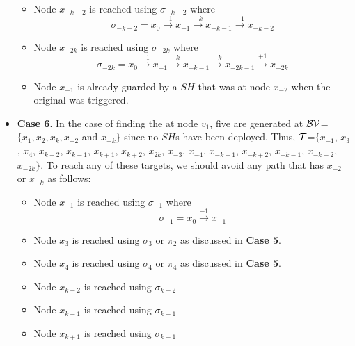\begin{itemize}
\begin{itemize}
\item Node $x_{-k-2}$ is reached using $\sigma_{-k-2}$  where 
$$\sigma_{-k-2} = x_{0} \xrightarrow {-1} x_{-1} \xrightarrow {-k} x_{-k-1} \xrightarrow {-1} x_{-k-2} $$





\item Node $x_{-2k}$ is reached using $\sigma_{-2k}$  where 
$$\sigma_{-2k} = x_{0} \xrightarrow {-1} x_{-1} \xrightarrow {-k} x_{-k-1} \xrightarrow {-k} x_{-2k-1} \xrightarrow {+1} x_{-2k}$$



\item Node $x_{-1}$ is already guarded by a $SH$ that was at node $x_{-2}$ when the original \bv was triggered.


\end{itemize}





\item {\bf Case 6}.  In the case of finding the \bv at node $v_1$, five \bvs are generated at $\cal BV$=$\{x_1,x_2,x_k,x_{-2}$ and $x_{-k}\}$ since no $SH$s have been deployed. Thus,
$\cal T$=$\{x_{-1}$, $ x_{3}$,  $x_{4}$, $x_{k-2}$, $x_{k-1}$, $x_{k+1}$, $x_{k+2}$, $x_{2k}$, $x_{-3}$, $x_{-4}$, $x_{-k+1}$, $x_{-k+2}$, $x_{-k-1}$, $x_{-k-2}$, $x_{-2k} \}$. To reach any of these targets, we should avoid any path that has $x_{-2}$ or $x_{-k}$ as follows:
\begin{itemize} 
\item Node $x_{-1}$ is reached using $\sigma_{-1}$ where 
$$\sigma_{-1} = x_{0} \xrightarrow {-1} x_{-1} $$


\item Node $x_{3}$ is reached using $\sigma_{3}$ or $\pi_2$ as discussed in {\bf Case 5}.

\item Node $x_{4}$ is reached using $\sigma_{4}$ or $\pi_4$ as discussed in {\bf Case 5}.

\item Node $x_{k-2}$ is reached using $\sigma_{k-2}$ 

\item Node $x_{k-1}$ is reached using $\sigma_{k-1}$ 

\item Node $x_{k+1}$ is reached using $\sigma_{k+1}$ 


\end{itemize}
\end{itemize}
